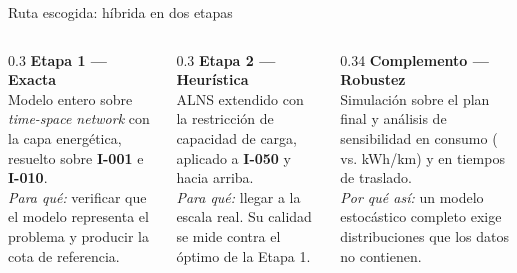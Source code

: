 \documentclass[aspectratio=169,11pt]{beamer}
\begin{document}
\begin{frame}{Ruta escogida: híbrida en dos etapas}
  \small
  \begin{columns}[t]
    \begin{column}{0.3\textwidth}
      {\color{ink}\bfseries Etapa 1 — Exacta}
      \footnotesize\\[3pt]
      Modelo entero sobre \textit{time-space network} con la capa energética,
      resuelto sobre \textbf{I-001} e \textbf{I-010}.
      \\[3pt]
      \textit{Para qué:} verificar que el modelo representa el problema y
      producir la cota de referencia.
    \end{column}
    \begin{column}{0.3\textwidth}
      {\color{ink}\bfseries Etapa 2 — Heurística}
      \footnotesize\\[3pt]
      ALNS extendido con la restricción de capacidad de carga, aplicado a
      \textbf{I-050} y hacia arriba.
      \\[3pt]
      \textit{Para qué:} llegar a la escala real. Su calidad se mide contra el
      óptimo de la Etapa 1.
    \end{column}
    \begin{column}{0.34\textwidth}
      {\color{ink}\bfseries Complemento — Robustez}
      \footnotesize\\[3pt]
      Simulación sobre el plan final y análisis de sensibilidad en consumo
      (\consumoReal{} vs. \consumoImplicito{} kWh/km) y en tiempos de traslado.
      \\[3pt]
      \textit{Por qué así:} un modelo estocástico completo exige distribuciones
      que los datos no contienen.
    \end{column}
  \end{columns}
\end{frame}
\end{document}
